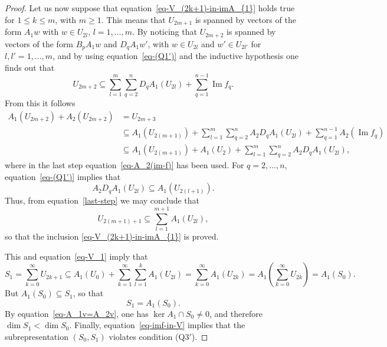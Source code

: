 \documentclass[pdftex]{sigma}
\numberwithin{equation}{section}
\begin{document}
\begin{proof}
Let us now suppose that equation~\eqref{eq-V_(2k+1)-in-imA_{1}} holds true for $1\leq k \leq m$, with $m\geq 1$. This means that $U_{2m+1}$ is spanned by vectors of the form
$A_{1}w$ with $w\in U_{2l}$, $l=1,\dots,m$.
By noticing that $U_{2m+2}$ is spanned by vectors of the form $B_{p}A_{1}w$ and $D_{q}A_{1}w'$, with $w\in U_{2l}$ and $w'\in U_{2l'}$ for $l,l'=1,\dots,m$, and by using equation~\eqref{eq-(Q1')} and the inductive hypothesis one
finds out that
\begin{equation*}
U_{2m+2}\subseteq \sum_{l=1}^{m} \sum_{q=2}^{n}D_{q}A_{1}(U_{2l})+\sum_{q=1}^{n-1}\operatorname{Im} f_{q} .
\end{equation*}
From this it follows
\begin{align}
A_1(U_{2m+2}) + A_2(U_{2m+2}) &= U_{2m+3} \nonumber\\
& \subseteq A_{1}(U_{2(m+1)})+\sum_{l=1}^{m} \sum_{q=2}^{n}A_{2}D_{q}A_{1}(U_{2l}) +\sum_{q=1}^{n-1}A_{2}(\operatorname{Im} f_{q}) \nonumber\\
& \subseteq A_{1}(U_{2(m+1)})+A_{1}(U_{2})+\sum_{l=1}^{m} \sum_{q=2}^{n}A_{2}D_{q}A_{1}(U_{2l}) ,\label{last-step}
\end{align}
where in the last step equation~\eqref{eq-A_2(im-f)} has been used.
For $q=2,\dots, n$, equation~\eqref{eq-(Q1')} implies that
\begin{equation*}
A_{2}D_{q}A_{1}(U_{2l}) \subseteq A_{1}(U_{2(l+1)}) .
\end{equation*}
Thus, from equation~\eqref{last-step} we may conclude that
\begin{equation*}
U_{2(m+1)+1}\subseteq\sum_{l=1}^{m+1}A_{1}(U_{2l}) ,
\end{equation*}
so that the inclusion \eqref{eq-V_(2k+1)-in-imA_{1}} is proved.

This and equation~\eqref{eq-V_1} imply that
\begin{equation*}
S_{1}=\sum_{k=0}^{\infty}U_{2k+1}\subseteq A_{1}(U_{0})+\sum_{k=1}^{\infty}\sum_{l=1}^{k}A_{1}(U_{2l})=\sum_{k=0}^{\infty}A_{1}(U_{2k})= A_{1}\left(\sum_{k=0}^{\infty}U_{2k}\right)=A_{1}(S_{0}).
\end{equation*}
But $A_{1}(S_{0})\subseteq S_{1}$, so that
\begin{equation*}
S_{1}=A_{1}(S_{0}) .
\end{equation*}
By equation~\eqref{eq-A_1v=A_2v}, one has $\ker A_{1}\cap S_{0}\neq0$, and therefore $\dim S_{1}<\dim S_{0}$.
Finally, equation~\eqref{eq-imf-in-V} implies that the subrepresentation $(S_{0},S_{1})$ violates condition (Q$3'$).
 \end{proof}
\end{document}

